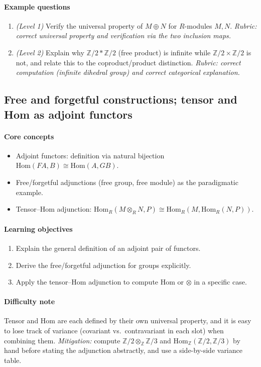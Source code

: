 \documentclass{article}
\begin{document}
\paragraph{Example questions}
\begin{enumerate}[nosep]
  \item \emph{(Level 1)} Verify the universal property of $M \oplus N$ for $R$-modules $M,N$. \emph{Rubric: correct universal property and verification via the two inclusion maps.}
  \item \emph{(Level 2)} Explain why $\mathbb{Z}/2 * \mathbb{Z}/2$ (free product) is infinite while $\mathbb{Z}/2 \times \mathbb{Z}/2$ is not, and relate this to the coproduct/product distinction. \emph{Rubric: correct computation (infinite dihedral group) and correct categorical explanation.}
\end{enumerate}

\subsection{Free and forgetful constructions; tensor and Hom as adjoint functors}
\paragraph{Core concepts}
\begin{itemize}[nosep]
  \item Adjoint functors: definition via natural bijection $\mathrm{Hom}(FA,B)\cong\mathrm{Hom}(A,GB)$.
  \item Free/forgetful adjunctions (free group, free module) as the paradigmatic example.
  \item Tensor--Hom adjunction: $\mathrm{Hom}_R(M\otimes_R N, P) \cong \mathrm{Hom}_R(M,\mathrm{Hom}_R(N,P))$.
\end{itemize}
\paragraph{Learning objectives}
\begin{enumerate}[nosep]
  \item Explain the general definition of an adjoint pair of functors.
  \item Derive the free/forgetful adjunction for groups explicitly.
  \item Apply the tensor--Hom adjunction to compute $\mathrm{Hom}$ or $\otimes$ in a specific case.
\end{enumerate}
\paragraph{Difficulty note}
Tensor and Hom are each defined by their own universal property, and it is easy to lose track of variance (covariant vs.\ contravariant in each slot) when combining them. \emph{Mitigation:} compute $\mathbb{Z}/2 \otimes_{\mathbb{Z}} \mathbb{Z}/3$ and $\mathrm{Hom}_{\mathbb{Z}}(\mathbb{Z}/2,\mathbb{Z}/3)$ by hand before stating the adjunction abstractly, and use a side-by-side variance table.
\end{document}
